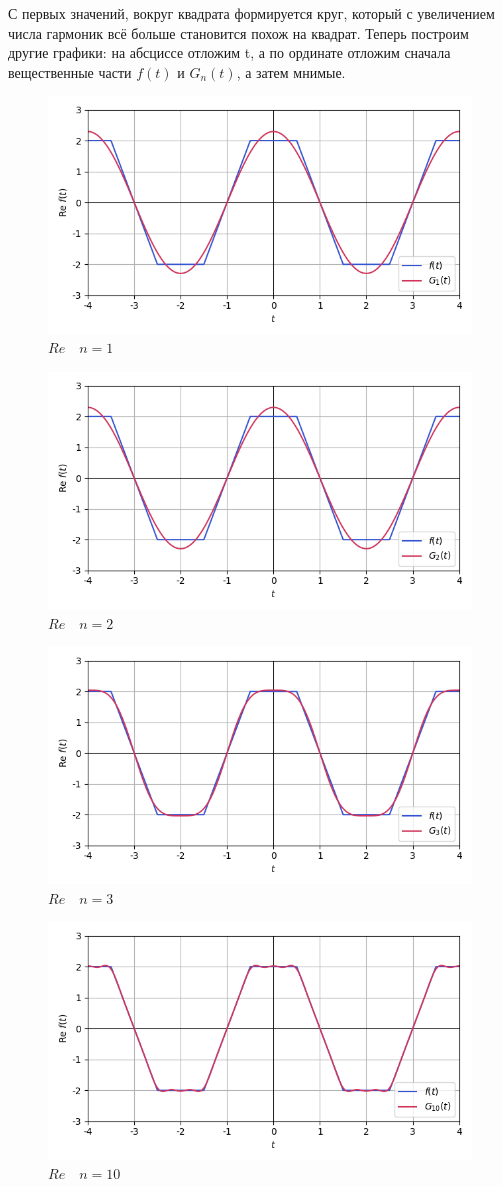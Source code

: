\documentclass[a4paper]{article}
\begin{document}
С первых значений, вокруг квадрата формируется круг, который с увеличением числа гармоник всё больше становится похож на квадрат. Теперь построим другие графики: на абсциссе отложим t, а по ординате отложим сначала вещественные части $f(t)$ и $G_n(t)$, а затем мнимые.
\begin{figure}[H]
    \centering
    \includegraphics[width=0.7\linewidth]{param/Re1.png}
    \caption{$Re\quad n = 1$}
\end{figure}
\begin{figure}[H]
    \centering
    \includegraphics[width=0.7\linewidth]{param/Re2.png}
    \caption{$Re\quad n = 2$}
\end{figure}
\begin{figure}[H]
    \centering
    \includegraphics[width=0.7\linewidth]{param/Re3.png}
    \caption{$Re\quad n = 3$}
\end{figure}
\begin{figure}[H]
    \centering
    \includegraphics[width=0.7\linewidth]{param/Re10.png}
    \caption{$Re\quad n = 10$}
\end{figure}
\end{document}
